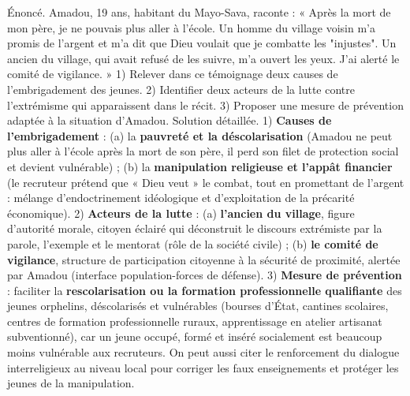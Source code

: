 \documentclass[11pt]{article}
\begin{document}
\begin{exoresolu}
Énoncé. Amadou, 19 ans, habitant du Mayo-Sava, raconte : « Après la mort de mon père, je ne pouvais plus aller à l'école. Un homme du village voisin m'a promis de l'argent et m'a dit que Dieu voulait que je combatte les "injustes". Un ancien du village, qui avait refusé de les suivre, m'a ouvert les yeux. J'ai alerté le comité de vigilance. »
1) Relever dans ce témoignage deux causes de l'embrigadement des jeunes.
2) Identifier deux acteurs de la lutte contre l'extrémisme qui apparaissent dans le récit.
3) Proposer une mesure de prévention adaptée à la situation d'Amadou.
\tcblower
Solution détaillée.
1) \textbf{Causes de l'embrigadement} : (a) la \textbf{pauvreté et la déscolarisation} (Amadou ne peut plus aller à l'école après la mort de son père, il perd son filet de protection social et devient vulnérable) ; (b) la \textbf{manipulation religieuse et l'appât financier} (le recruteur prétend que « Dieu veut » le combat, tout en promettant de l'argent : mélange d'endoctrinement idéologique et d'exploitation de la précarité économique).
2) \textbf{Acteurs de la lutte} : (a) \textbf{l'ancien du village}, figure d'autorité morale, citoyen éclairé qui déconstruit le discours extrémiste par la parole, l'exemple et le mentorat (rôle de la société civile) ; (b) \textbf{le comité de vigilance}, structure de participation citoyenne à la sécurité de proximité, alertée par Amadou (interface population-forces de défense).
3) \textbf{Mesure de prévention} : faciliter la \textbf{rescolarisation ou la formation professionnelle qualifiante} des jeunes orphelins, déscolarisés et vulnérables (bourses d'État, cantines scolaires, centres de formation professionnelle ruraux, apprentissage en atelier artisanat subventionné), car un jeune occupé, formé et inséré socialement est beaucoup moins vulnérable aux recruteurs. On peut aussi citer le renforcement du dialogue interreligieux au niveau local pour corriger les faux enseignements et protéger les jeunes de la manipulation.
\end{exoresolu}
\end{document}
